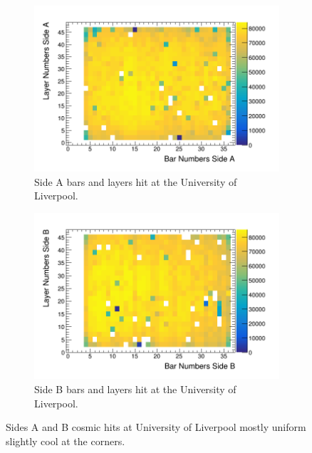 \documentclass[12pt,a4paper]{article}
\begin{document}
\begin{figure}[H]
\centering
\begin{subfigure}{.5\textwidth}
  \centering
  \includegraphics[width=\linewidth]{sidesAB/liverpoolSideAHits.png}
  \captionsetup{width=.9\linewidth}
  \caption{Side A bars and layers hit at the University of Liverpool.}
  \label{subFig:sideA_UOL}
\end{subfigure}%
\begin{subfigure}{.5\textwidth}
  \centering
  \includegraphics[width=\linewidth]{sidesAB/liverpoolSideBHits.png}
  \captionsetup{width=.9\linewidth}
  \caption{Side B bars and layers hit at the University of Liverpool.}
  \label{subFig:sideB_UOL}
\end{subfigure}
\caption{Sides A and B cosmic hits at University of Liverpool mostly uniform slightly cool at the corners.}
\label{fig:sideAB_UOL}
\end{figure}
\end{document}
